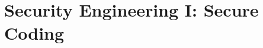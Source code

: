 \documentclass[../main.tex]{subfiles}
\begin{document}
\chapter{Security Engineering I: Secure Coding}
\label{ch:secure-coding}

\end{document}

